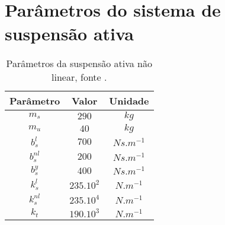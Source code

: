 \section{\\Parâmetros do sistema de suspensão ativa}
\begin{table}[h!]
\centering
    \begin{tabular}{|c|c|c|}
        \hline
        Parâmetro & Valor & Unidade\\
        \hline
        \hline
        $m_s$& $290$& $kg$\\
        $m_u$& $40$& $kg$\\
        $b^{l}_s$& $700$& $Ns.m^{-1}$\\
        $b^{nl}_s$& $200$& $Ns.m^{-1}$\\
        $b^{y}_s$& $400$& $Ns.m^{-1}$\\
        $k^{l}_s$& $235.10^2$& $N.m^{-1}$\\
        $k^{nl}_s$& $235.10^4$& $N.m^{-1}$\\
        $k_t$& $190.10^3$& $N.m^{-1}$\\
        \hline
    \end{tabular}    \label{tb:parametros}\caption{Parâmetros da suspensão ativa não linear, fonte \cite{MarceloTusset2008MINISTERIOPor}.}
\end{table}

